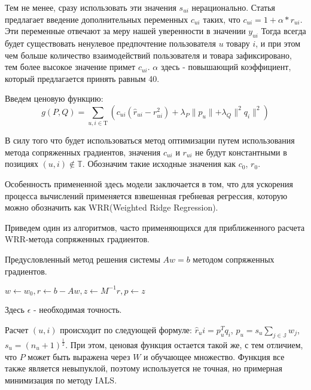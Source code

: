 \documentclass[14pt]{mmcs_article}
\begin{document}
Тем не менее, сразу использовать эти значения $s_{ui}$ нерационально. Статья \cite{ALS:CFIFD} предлагает введение дополнительных переменных $c_{ui}$ таких, что $c_{ui} = 1 + \alpha * r_{ui}$. Эти переменные отвечают за меру нашей уверенности в значении $y_{ui}$ Тогда всегда будет существовать ненулевое предпочтение пользователя $u$ товару $i$, и при этом чем больше количество взаимодействий пользователя и товара зафиксировано, тем более высокое значение примет $c_{ui}$. $\alpha$ здесь - повышающий коэффициент, который предлагается принять равным 40. 

Введем ценовую функцию:
\begin{equation}
	g(P, Q) = \sum_{u, i \in \mathrm{T}} (c_{ui}(\hat{r}_{ui} - r_{ui}^2) + \lambda_P\parallel p_u \parallel + \lambda_Q\parallel^2 q_i \parallel^2) 
\end{equation}

В силу того что будет использоваться метод оптимизации путем использования метода сопряженных градиентов, значения $c_{ui}$ и $r_{ui}$ не будут константными в позициях $(u,i) \not\in \mathbb{T}$. Обозначим такие исходные значения как $c_0$, $r_0$.

Особенность примененной здесь модели заключается в том, что для ускорения процесса вычислений применяется взвешенная гребневая регрессия, которую можно обозначить как WRR(Weighted Ridge Regression).

Приведем один из алгоритмов, часто применяющихся для приближенного расчета WRR-метода сопряженных градиентов.

\begin{algorithm}[H]
	\caption{Предусловленный метод решения системы $Aw = b$ методом сопряженных градиентов.}
	
	$w \leftarrow w_0, r \leftarrow b - Aw, z \leftarrow M^{-1}r, p \leftarrow z$
\end{algorithm}

Здесь $\epsilon$ - необходимая точность.

Расчет $(u,i)$ происходит по следующей формуле: $\hat{r}_ui = p_u^T q_i$,  $p_u = s_u \sum_{j \in \mathbb{J}}w_j$, $s_u = (n_u + 1)^{\frac{1}{2}}$. При этом, ценовая функция остается такой же, с тем отличием, что $P$ может быть выражена через $W$ и обучающее множество. Функция все также является невыпуклой, поэтому используется не точная, но примерная минимизация по методу IALS.
\end{document}
